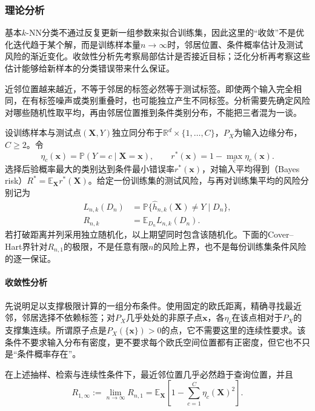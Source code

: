 \subsubsection{理论分析}
\label{sec:classification-knn-theory}

基本$k$-NN分类不通过反复更新一组参数来拟合训练集，因此这里的“收敛”不是优化迭代趋于某个解，而是训练样本量$n\to\infty$时，邻居位置、条件概率估计及测试风险的渐近变化。收敛性分析先考察局部估计是否接近目标；泛化分析再考察这些估计能够给新样本的分类错误带来什么保证。

近邻位置越来越近，不等于邻居的标签必然等于测试标签。即使两个输入完全相同，在有标签噪声或类别重叠时，也可能独立产生不同标签。分析需要先确定风险对哪些随机性取平均，再由邻居位置推到条件类别分布，不能把三者混为一谈。

设训练样本与测试点$(\bm{X},Y)$独立同分布于$\mathbb{R}^d\times\{1,\ldots,C\}$，$P_X$为输入边缘分布，$C\geq2$。令
\begin{equation}
  \eta_c(\bm{x})=\mathbb{P}(Y=c\mid\bm{X}=\bm{x}),
  \qquad
  r^\ast(\bm{x})=1-\max_c\eta_c(\bm{x}).
  \label{eq:classification-local-bayes-risk}
\end{equation}
选择后验概率最大的类别达到条件最小错误率$r^\ast(\bm{x})$，对输入平均得到（Bayes risk）$R^\ast=\mathbb{E}_{\bm{X}}r^\ast(\bm{X})$。给定一份训练集的测试风险，与再对训练集平均的风险分别记为
\begin{align}
  L_{n,k}(D_n)
  &=\mathbb{P}\{\hat h_{n,k}(\bm{X})\neq Y\mid D_n\},
  \label{eq:classification-knn-conditional-risk}\\
  R_{n,k}&=\mathbb{E}_{D_n}L_{n,k}(D_n).
  \label{eq:classification-knn-expected-risk}
\end{align}
若打破距离并列采用独立随机化，以上期望同时包含该随机化。下面的Cover--Hart界针对$R_{n,1}$的极限，不是任意有限$n$的风险上界，也不是每份训练集条件风险的逐一保证。

\paragraph{收敛性分析}

先说明足以支撑极限计算的一组分布条件。使用固定的欧氏距离，精确寻找最近邻，邻居选择不依赖标签；对$P_X$几乎处处的非原子点$\bm{x}$，各$\eta_c$在该点相对于$P_X$的支撑集连续。所谓原子点是$P_X(\{\bm{x}\})>0$的点，它不需要这里的连续性要求。该条件不要求输入分布有密度，更不要求每个欧氏空间位置都有正密度，但它也不只是“条件概率存在”。

\begin{lemma}[最近邻风险的极限]
  \label{lem:classification-nearest-neighbor-limit}
  在上述抽样、检索与连续性条件下，最近邻位置几乎必然趋于查询位置，并且
  \begin{equation}
    R_{1,\infty}:=\lim_{n\to\infty}R_{n,1}
    =\mathbb{E}_{\bm{X}}\left[
      1-\sum_{c=1}^{C}\eta_c(\bm{X})^2
    \right].
    \label{eq:classification-nearest-neighbor-limit}
  \end{equation}
\end{lemma}


